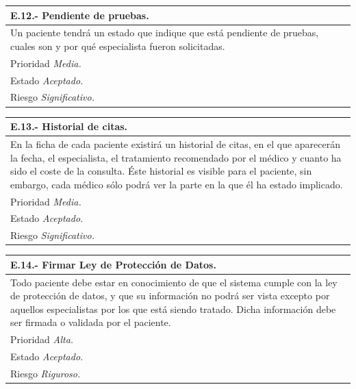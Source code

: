 \documentclass[a4paper,oneside,11pt]{book}
\begin{document}
\begin{center}
\begin{tabulary}{15cm}{|L|}
	\hline
		\bf{E.12.- Pendiente de pruebas.} \\
	\hline
		Un paciente tendrá un estado que indique que está pendiente de pruebas, cuales son y por qué especialista fueron solicitadas. \\
	\hline
		Prioridad \textit{Media.} \\
	\hline
		Estado \textit{Aceptado.} \\
	\hline
		Riesgo \textit{Significativo.} \\
	\hline
\end{tabulary}
\end{center}

\begin{center}
\begin{tabulary}{15cm}{|L|}
	\hline
		\bf{E.13.- Historial de citas.} \\
	\hline
		En la ficha de cada paciente existirá un historial de citas, en el que aparecerán la fecha, el especialista, el tratamiento recomendado por el médico y cuanto ha sido el coste de la consulta. Éste historial es visible para el paciente, sin embargo, cada médico sólo podrá ver la parte en la que él ha estado implicado. \\
	\hline
		Prioridad \textit{Media.} \\
	\hline
		Estado \textit{Aceptado.} \\
	\hline
		Riesgo \textit{Significativo.} \\
	\hline
\end{tabulary}
\end{center}

\begin{center}
\begin{tabulary}{15cm}{|L|}
	\hline
		\bf{E.14.- Firmar Ley de Protección de Datos.} \\
	\hline
		Todo paciente debe estar en conocimiento de que el sistema cumple con la ley de protección de datos, y que su información no podrá ser vista excepto por aquellos especialistas por los que está siendo tratado. Dicha información debe ser firmada o validada por el paciente. \\
	\hline
		Prioridad \textit{Alta.} \\
	\hline
		Estado \textit{Aceptado.} \\
	\hline
		Riesgo \textit{Riguroso.} \\
	\hline
\end{tabulary}
\end{center}
\end{document}
